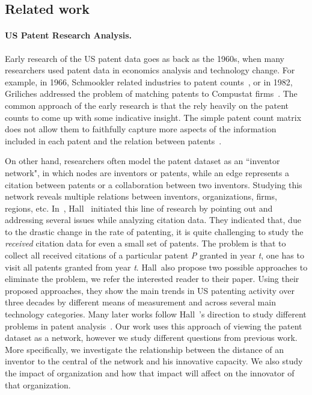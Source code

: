 \subsection{Related work}
\paragraph{US Patent Research Analysis.} Early research of the US patent data goes
as back as the 1960s, when many researchers used patent data in economics
analysis and technology change. For example, in 1966,  Schmookler related 
industries to patent counts~\cite{Schmookler1966}, or in 1982, Griliches
addressed the problem of matching patents to Compustat
firms~\cite{Griliches1982}. The common approach of the early research is that
the rely heavily on the patent counts to come up with some indicative insight.
The simple patent count matrix does not allow them to faithfully capture more
aspects of the information included in each patent and the relation between
patents~\cite{Griliches1987}.

On other hand, researchers often model the patent dataset as
an ``inventor network", in which nodes are inventors or patents, while an edge
represents a citation between patents or a collaboration between two inventors.
Studying this network reveals multiple relations between inventors,
organizations, firms, regions, etc. In~\cite{Hall01thenber}, Hall~\etal
initiated this line of research by pointing out and addressing several issues
while analyzing citation data. They indicated that, due to the drastic change
in the rate of patenting, it is quite challenging to study the {\em received}
citation data for even a small set of patents. The problem is that to collect
all received citations of a particular patent {\em P} granted in year {\em t},
one has to visit all patents granted from year {\em t}. Hall~\etal also propose
two possible approaches to eliminate the problem, we refer the interested
reader to their paper. Using their proposed approaches, they show the main
trends in US patenting activity over three decades by different means of
measurement and across several main technology categories. Many later works
follow Hall~\etal's direction to study different problems in patent
analysis~\cite{Leskovec:2005, Hall2000, leskovec2007graph, Acs2002}. 
Our work uses this approach of viewing the patent dataset as a network, however we study 
different questions from previous work. More specifically, we investigate the relationship between the distance of 
an inventor to the central of the network and his innovative capacity. We also study the impact of organization and how that impact will affect on the innovator of that organization.

